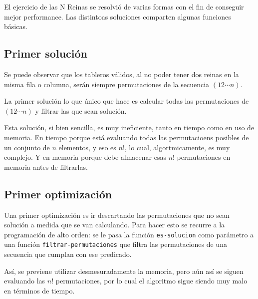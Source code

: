 \documentclass[12pt,titlepage]{article}
\begin{document}
El ejercicio de las N Reinas se resolvió de varias formas con el fin de conseguir mejor performance. Las distintoas soluciones comparten algunas funciones básicas.



\subsection{Primer solución}

Se puede observar que los tableros válidos, al no poder tener dos reinas en la misma fila o columna, serán siempre permutaciones de la secuencia $(1 2 \cdots n)$.

La primer solución lo que único que hace es calcular todas las permutaciones de $(1 2 \cdots n)$ y filtrar las que sean solución.



Esta solución, si bien sencilla, es muy ineficiente, tanto en tiempo como en uso de memoria. En tiempo porque está evaluando todas las permutacioens posibles de un conjunto de $n$ elementos, y eso es $n!$, lo cual, algortmicamente, es muy complejo. Y en memoria porque debe almacenar esas $n!$ permutaciones en memoria antes de filtrarlas.

\subsection{Primer optimización}

Una primer optimización es ir descartando las permutaciones que no sean solución a medida que se van calculando. Para hacer esto se recurre a la programación de alto orden: se le pasa la función \lstinline|es-solucion| como parámetro a una función \lstinline|filtrar-permutaciones| que filtra las permutaciones de una secuencia que cumplan con ese predicado.



Así, se previene utilizar desmesuradamente la memoria, pero aún así se siguen evaluando las $n!$ permutaciones, por lo cual el algoritmo sigue siendo muy malo en términos de tiempo.
\end{document}
